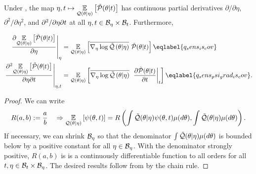 
\begin{lem}

Under , the map $\eta, t \mapsto \underset{\mathcal{Q}(\theta
\vert \eta)}{\mathbb{E}}\left[\tilde{\mathcal{P}}(\theta \vert t)\right]$ has continuous partial derivatives
$\partial / \partial \eta$, $\partial^2 / \partial \eta^2$, and $\partial^2 /
\partial \eta \partial t$ at all $\eta, t \in \mathcal{B}_\eta \times \mathcal{B}_t$.
Furthermore,

\begin{align}
\fracat{\partial \expect{\q(\theta \vert \eta)}
              {\ptil(\theta \vert \t)}}{\partial \eta}{\eta}
={}&
\expect{\q(\theta \vert \eta)}
       {\lqgradbar{\theta \vert \eta}
       \ptil(\theta \vert \t)}
       \eqlabel{q_sens_is_cov}\\
%
\fracat{\partial^2 \expect{\q(\theta \vert \eta)}
      {\ptil(\theta \vert \t)}}{\partial \eta \partial \t}{\eta, \t}
={}&
\expect{\q(\theta \vert \eta)}
       {\lqgradbar{\theta \vert \eta}
       \fracat{\partial \ptil(\theta \vert \t)}{\partial \t}{\t}}
\eqlabel{q_sens_psi_grad_is_cov}.
%
\end{align}
%
\begin{proof}
%
We can write
%
\begin{align*}
%
R(a, b) :={} \frac{a}{b} \quad \Rightarrow
\expect{\q(\theta \vert \eta)}{\psi(\theta, \t)} ={}
R\left(\int \qtil(\theta \vert \eta) \psi(\theta, \t) \mu(d\theta),
  \int \qtil(\theta \vert \eta) \mu(d\theta)\right).
%
\end{align*}
%
If necessary, we can shrink $\mathcal{B}_\eta$ so that the denominator $\int
\tilde{\mathcal{Q}}(\theta \vert \eta) \mu(d\theta)$ is bounded below by a positive constant
for all $\eta \in \mathcal{B}_\eta$.  With the denominator strongly positive, $R(a,b)$
is is a continuously differentiable function to all orders for all $t, \eta \in
\mathcal{B}_t \times \mathcal{B}_\eta$.  The desired results follow from
 by the chain rule.

\end{proof}
%
\end{lem}
